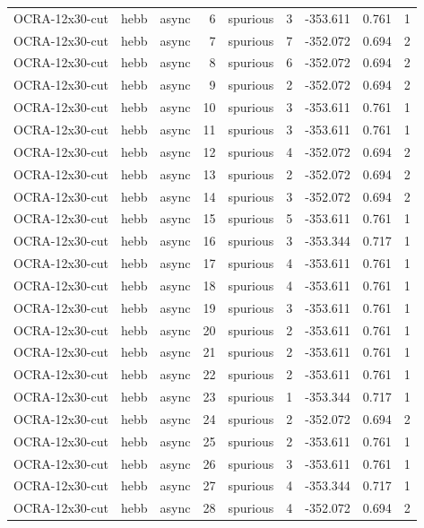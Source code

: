 \begin{tabular}{lllrlrrrr}
OCRA-12x30-cut & hebb & async & 6 & spurious & 3 & -353.611 & 0.761 & 1 \\
OCRA-12x30-cut & hebb & async & 7 & spurious & 7 & -352.072 & 0.694 & 2 \\
OCRA-12x30-cut & hebb & async & 8 & spurious & 6 & -352.072 & 0.694 & 2 \\
OCRA-12x30-cut & hebb & async & 9 & spurious & 2 & -352.072 & 0.694 & 2 \\
OCRA-12x30-cut & hebb & async & 10 & spurious & 3 & -353.611 & 0.761 & 1 \\
OCRA-12x30-cut & hebb & async & 11 & spurious & 3 & -353.611 & 0.761 & 1 \\
OCRA-12x30-cut & hebb & async & 12 & spurious & 4 & -352.072 & 0.694 & 2 \\
OCRA-12x30-cut & hebb & async & 13 & spurious & 2 & -352.072 & 0.694 & 2 \\
OCRA-12x30-cut & hebb & async & 14 & spurious & 3 & -352.072 & 0.694 & 2 \\
OCRA-12x30-cut & hebb & async & 15 & spurious & 5 & -353.611 & 0.761 & 1 \\
OCRA-12x30-cut & hebb & async & 16 & spurious & 3 & -353.344 & 0.717 & 1 \\
OCRA-12x30-cut & hebb & async & 17 & spurious & 4 & -353.611 & 0.761 & 1 \\
OCRA-12x30-cut & hebb & async & 18 & spurious & 4 & -353.611 & 0.761 & 1 \\
OCRA-12x30-cut & hebb & async & 19 & spurious & 3 & -353.611 & 0.761 & 1 \\
OCRA-12x30-cut & hebb & async & 20 & spurious & 2 & -353.611 & 0.761 & 1 \\
OCRA-12x30-cut & hebb & async & 21 & spurious & 2 & -353.611 & 0.761 & 1 \\
OCRA-12x30-cut & hebb & async & 22 & spurious & 2 & -353.611 & 0.761 & 1 \\
OCRA-12x30-cut & hebb & async & 23 & spurious & 1 & -353.344 & 0.717 & 1 \\
OCRA-12x30-cut & hebb & async & 24 & spurious & 2 & -352.072 & 0.694 & 2 \\
OCRA-12x30-cut & hebb & async & 25 & spurious & 2 & -353.611 & 0.761 & 1 \\
OCRA-12x30-cut & hebb & async & 26 & spurious & 3 & -353.611 & 0.761 & 1 \\
OCRA-12x30-cut & hebb & async & 27 & spurious & 4 & -353.344 & 0.717 & 1 \\
OCRA-12x30-cut & hebb & async & 28 & spurious & 4 & -352.072 & 0.694 & 2 \\

\end{tabular}
